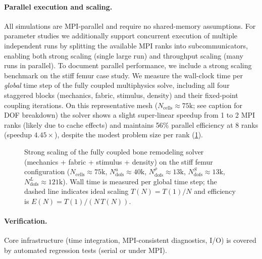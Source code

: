 \paragraph{Parallel execution and scaling.}
All simulations are MPI-parallel and require no shared-memory assumptions.
For parameter studies we additionally support concurrent execution of multiple independent runs by splitting the available MPI ranks into subcommunicators, enabling both strong scaling (single large run) and throughput scaling (many runs in parallel).
To document parallel performance, we include a strong scaling benchmark on the stiff femur case study.
We measure the wall-clock time per \emph{global} time step of the fully coupled multiphysics solve, including all four staggered blocks (mechanics, fabric, stimulus, density) and their fixed-point coupling iterations.
On this representative mesh ($N_{\mathrm{cells}}\approx 75\mathrm{k}$; see caption for DOF breakdown) the solver shows a slight super-linear speedup from 1 to 2 MPI ranks (likely due to cache effects) and maintains 56\% parallel efficiency at 8 ranks (speedup $4.45\times$), despite the modest problem size per rank (\cref{fig:strong_scaling}).

\begin{figure}[htbp]
    \centering
    \caption{Strong scaling of the fully coupled bone remodeling solver (mechanics + fabric + stimulus + density) on the stiff femur configuration ($N_{\mathrm{cells}}\approx 75\mathrm{k}$, $N_{\mathrm{dofs}}^{u}\approx 40\mathrm{k}$, $N_{\mathrm{dofs}}^{\rho}\approx 13\mathrm{k}$, $N_{\mathrm{dofs}}^{S}\approx 13\mathrm{k}$, $N_{\mathrm{dofs}}^{L}\approx 121\mathrm{k}$). Wall time is measured per global time step; the dashed line indicates ideal scaling $T(N)=T(1)/N$ and efficiency is $E(N)=T(1)/(N\,T(N))$. }
    \label{fig:strong_scaling}
\end{figure}

\paragraph{Verification.}
Core infrastructure (time integration, MPI-consistent diagnostics, I/O) is covered by automated regression tests (serial or under MPI).
